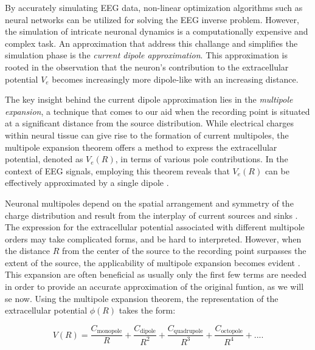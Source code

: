 \documentclass[a4paper, UKenglish, 11pt]{uiomaster}
\begin{document}
By accurately simulating EEG data, non-linear optimization algorithms such as neural networks can be utilized for solving the EEG inverse problem. However, the simulation of intricate neuronal dynamics is a computationally expensive and complex task.  An approximation that address this challange and simplifies the simulation phase is the \emph{current dipole approximation}. This approximation is rooted in the observation that the neuron's contribution to the extracellular potential $V_e$ becomes increasingly more dipole-like with an increasing distance.

The key insight behind the current dipole approximation lies in the \emph{multipole expansion}, a technique that comes to our aid when the recording point is situated at a significant distance from the source distribution. While electrical charges within neural tissue can give rise to the formation of current multipoles, the multipole expansion theorem offers a method to express the extracellular potential, denoted as $V_e(R)$, in terms of various pole contributions. In the context of EEG signals, employing this theorem reveals that $V_e(R)$ can be effectively approximated by a single dipole \cite{brainmodel2022}. 

Neuronal multipoles depend on the spatial arrangement and symmetry of the charge distribution and result from the interplay of current sources and sinks \cite{wiki:multipoles}. The expression for the extracellular potential associated with different multipole orders may take complicated forms, and be hard to interpreted. However, when the distance $R$ from the center of the source to the recording point surpasses the extent of the source, the applicability of multipole expansion becomes evident \cite{jackson1999classical} . This expansion are often beneficial as usually only the first few terms are needed in order to provide an accurate approximation of the original funtion, as we will se now. Using the multipole expansion theorem, the representation of the extracellular potential $\phi(R)$ takes the form:

\begin{equation}
  V(R) = \frac{C_{\text{monopole}}}{R} + \frac{C_{\text{dipole}}}{R^2} + \frac{C_{\text{quadrupole}}}{R^3} + \frac{C_{\text{octopole}}}{R^4} + ... .
\label{eq:extracellular_potential}
\end{equation}
\end{document}
